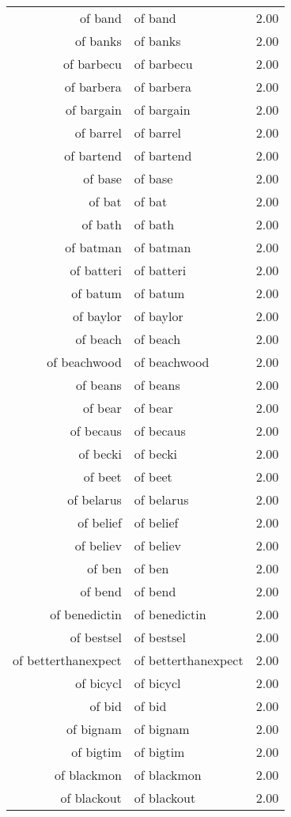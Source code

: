 \begin{table}[ht]
\begin{tabular}{rlr}
  of band & of band & 2.00 \\ 
  of banks & of banks & 2.00 \\ 
  of barbecu & of barbecu & 2.00 \\ 
  of barbera & of barbera & 2.00 \\ 
  of bargain & of bargain & 2.00 \\ 
  of barrel & of barrel & 2.00 \\ 
  of bartend & of bartend & 2.00 \\ 
  of base & of base & 2.00 \\ 
  of bat & of bat & 2.00 \\ 
  of bath & of bath & 2.00 \\ 
  of batman & of batman & 2.00 \\ 
  of batteri & of batteri & 2.00 \\ 
  of batum & of batum & 2.00 \\ 
  of baylor & of baylor & 2.00 \\ 
  of beach & of beach & 2.00 \\ 
  of beachwood & of beachwood & 2.00 \\ 
  of beans & of beans & 2.00 \\ 
  of bear & of bear & 2.00 \\ 
  of becaus & of becaus & 2.00 \\ 
  of becki & of becki & 2.00 \\ 
  of beet & of beet & 2.00 \\ 
  of belarus & of belarus & 2.00 \\ 
  of belief & of belief & 2.00 \\ 
  of believ & of believ & 2.00 \\ 
  of ben & of ben & 2.00 \\ 
  of bend & of bend & 2.00 \\ 
  of benedictin & of benedictin & 2.00 \\ 
  of bestsel & of bestsel & 2.00 \\ 
  of betterthanexpect & of betterthanexpect & 2.00 \\ 
  of bicycl & of bicycl & 2.00 \\ 
  of bid & of bid & 2.00 \\ 
  of bignam & of bignam & 2.00 \\ 
  of bigtim & of bigtim & 2.00 \\ 
  of blackmon & of blackmon & 2.00 \\ 
  of blackout & of blackout & 2.00 \\ 

\end{tabular}
\end{table}
